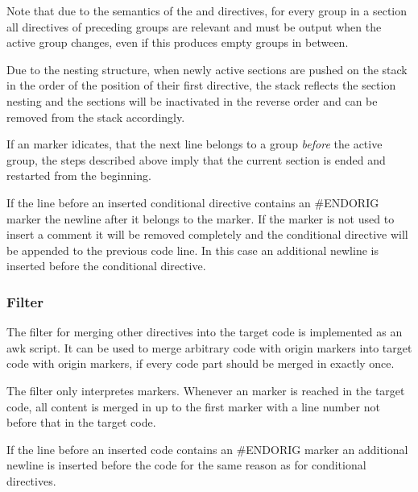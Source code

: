Note that due to the semantics of the  and  directives, for every group in a section all
directives of preceding groups are relevant and must be output when the active group changes, even if this produces 
empty groups in between.

Due to the nesting structure, when newly active sections are pushed on the stack in the order of the position of their
first directive, the stack reflects the section nesting and the sections will be inactivated in the reverse order and
can be removed from the stack accordingly.

If an  marker idicates, that the next line belongs to a group \textit{before} the active group, the
steps described above imply that the current section is ended and restarted from the beginning.

If the line before an inserted conditional directive contains an #ENDORIG marker the newline after it belongs
to the marker. If the marker is not used to insert a comment it will be removed completely and the conditional
directive will be appended to the previous code line. In this case an additional newline is inserted before 
the conditional directive.

\subsubsection{Filter }

The filter for merging other directives into the target code is implemented as an awk script. It can be used to 
merge arbitrary code with origin markers into target code with origin markers, if every code part should be
merged in exactly once.

The filter only interpretes  markers. Whenever an  marker is reached in the target
code, all content is merged in up to the first  marker with a line number not before that in the target
code.

If the line before an inserted code contains an #ENDORIG marker an additional newline is inserted before 
the code for the same reason as for conditional directives.
